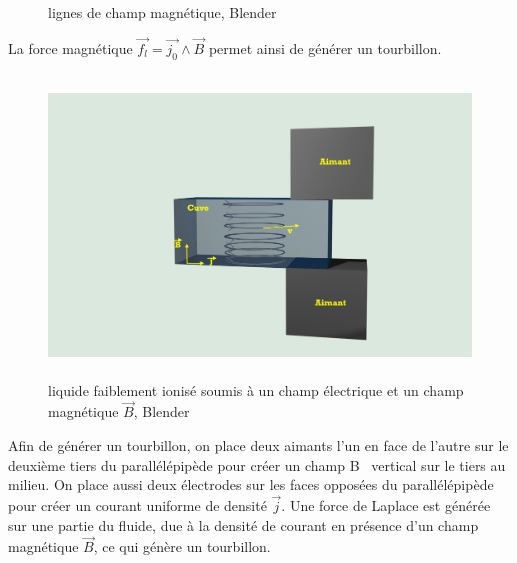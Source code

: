 \documentclass[a4paper,12pt,titlepage]{report}
\begin{document}
\begin{onehalfspace}
\begin{figure}[!h]
\begin{center}
		\caption{lignes de champ magnétique, Blender}
	\end{center}
\end{figure}
\newpage
La force magnétique $\vec{f_l}=\vec{j_0}\land\vec{B}$ permet ainsi de générer un tourbillon.\newline
\begin{figure}[h]
	\begin{center}
	\centering	
		\includegraphics[height = 8cm, keepaspectratio]{graphes/champvec2.png}
		\caption{liquide faiblement ionisé soumis à un champ électrique et un champ magnétique $\vec{B}$, Blender}
	\end{center}
\end{figure}
Afin de générer un tourbillon, on place deux aimants l'un en face de l’autre sur le deuxième tiers du parallélépipède pour créer un champ B~ vertical sur le tiers au milieu.
On place aussi deux électrodes sur les faces opposées du parallélépipède pour créer un courant uniforme de densité $\vec{j}$.
Une force de Laplace est générée sur une partie du fluide, due à la densité de courant en présence d’un champ magnétique $\vec{B}$, ce qui génère un tourbillon. \\
\begin{figure}[!h]
	\begin{center}
	\centering

\end{center}
\end{figure}
\end{onehalfspace}
\end{document}
